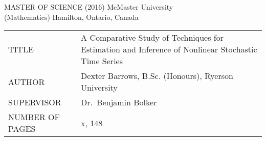 \newpage
\thispagestyle{empty}
\centering
\null


MASTER OF SCIENCE (2016) 	\hfill 	McMaster University \\
(Mathematics)				\hfill	Hamilton, Ontario, Canada \\

\vspace{3cm}

\begin{tabular}{p{5cm}p{10cm}}
	TITLE 			& A Comparative Study of Techniques for Estimation and Inference of Nonlinear Stochastic Time Series \\
	AUTHOR 			& Dexter Barrows, B.Sc. (Honours), Ryerson University \\
	SUPERVISOR 		& Dr.~Benjamin Bolker \\
	NUMBER OF PAGES & x, 148 \\
\end{tabular}